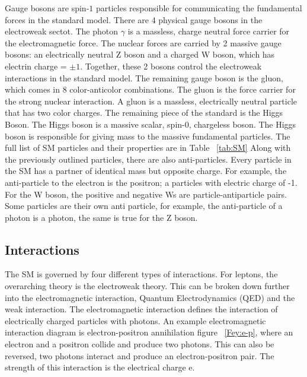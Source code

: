 \indent Gauge bosons are spin-${1}$ particles responsible for communicating the fundamental forces in the standard model. There are 4 physical gauge bosons in the electroweak sectot. The photon ${\gamma}$ is a massless, charge neutral force carrier for the electromagnetic force. The nuclear forces are carried by 2 massive gauge bosons:  an electrically neutral Z boson and a charged W boson, which has electrin charge = ${\pm 1}$. Together, these 2 bosons control the electroweak interactions in the standard model. The remaining gauge boson is the gluon, which comes in 8 color-anticolor combinations. The gluon is the force carrier for the strong nuclear interaction. A gluon is a massless, electrically neutral particle that has two color charges. \newline%
\indent The remaining piece of the standard is the Higgs Boson. The Higgs boson is a massive scalar, spin-${0}$, chargeless boson. The Higgs boson is responsible for giving mass to the massive fundamental particles. The full list of SM particles and their properties are in Table ~\ref{tab:SM}\newline
\indent Along with the previously outlined particles, there are also anti-particles. Every particle in the SM has a partner of identical mass but opposite charge. For example, the anti-particle to the electron is the positron; a particles with electric charge of -1. For the W boson, the positive and negative Ws are particle-antiparticle pairs. Some particles are their own anti particle, for example, the anti-particle of a photon is a photon, the same is true for the Z boson.\newline
\subsection{Interactions}
The SM is governed by four different types of interactions. For leptons, the overarching theory is the electroweak theory. This can be broken down further into the electromagnetic interaction, Quantum Electrodynamics (QED) and the weak interaction. The electromagnetic interaction defines the interaction of electrically charged particles with photons. An example electromagnetic interaction diagram is electron-positron annihilation figure ~\ref{Fey:e-p}, where an electron and a positron collide and produce two photons. This can also be reversed, two photons interact and produce an electron-positron pair. The strength of this interaction is the electrical charge e. \newline


